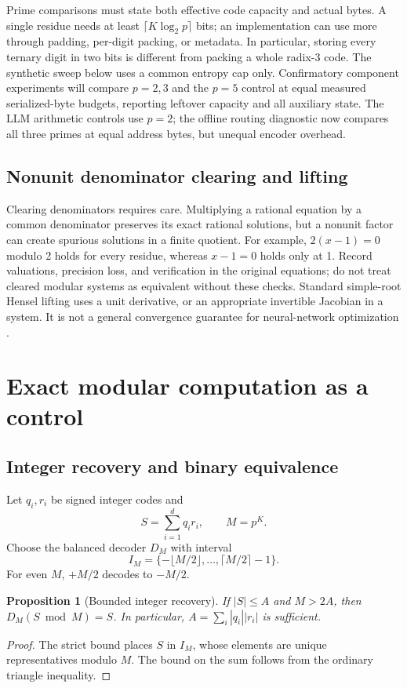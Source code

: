 \documentclass[11pt]{article}
\newtheorem{proposition}{Proposition}
\begin{document}
Prime comparisons must state both effective code capacity and actual bytes.
A single residue needs at least \(\lceil K\log_2p\rceil\) bits; an implementation
can use more through padding, per-digit packing, or metadata. In particular,
storing every ternary digit in two bits is different from packing a whole
radix-3 code. The synthetic sweep below uses a common entropy cap only.
Confirmatory component experiments will compare \(p=2,3\) and the \(p=5\) control
at equal measured serialized-byte budgets, reporting leftover capacity and
all auxiliary state. The LLM arithmetic controls use \(p=2\); the offline routing diagnostic now
compares all three primes at equal address bytes, but unequal encoder overhead.

\subsection{Nonunit denominator clearing and lifting}

Clearing denominators requires care. Multiplying a rational equation by a
common denominator preserves its exact rational solutions, but a nonunit
factor can create spurious solutions in a finite quotient. For example,
\(2(x-1)=0\) modulo 2 holds for every residue, whereas \(x-1=0\) holds only at 1.
Record valuations, precision loss, and verification in the original equations;
do not treat cleared modular systems as equivalent without these checks.
Standard simple-root Hensel lifting uses a unit derivative, or an appropriate
invertible Jacobian in a system. It is not a general convergence guarantee for
neural-network optimization \citep{caruso2017computations,padiclowbit2026}.


\section{Exact modular computation as a control}
\label{si:arithmetic}

\subsection{Integer recovery and binary equivalence}

Let \(q_i,r_i\) be signed integer codes and
\[
 S=\sum_{i=1}^{d}q_i r_i,\qquad M=p^K.
\]
Choose the balanced decoder \(D_M\) with interval
\[
 I_M=\{-\lfloor M/2\rfloor,\ldots,\lceil M/2\rceil-1\}.
\]
For even \(M\), \(+M/2\) decodes to \(-M/2\).

\begin{proposition}[Bounded integer recovery]
If \(|S|\leq A\) and \(M>2A\), then \(D_M(S\bmod M)=S\).
In particular, \(A=\sum_i|q_i||r_i|\) is sufficient.
\end{proposition}
\begin{proof}
The strict bound places \(S\) in \(I_M\), whose elements are unique
representatives modulo \(M\). The bound on the sum follows from the
ordinary triangle inequality.
\end{proof}
\end{document}
